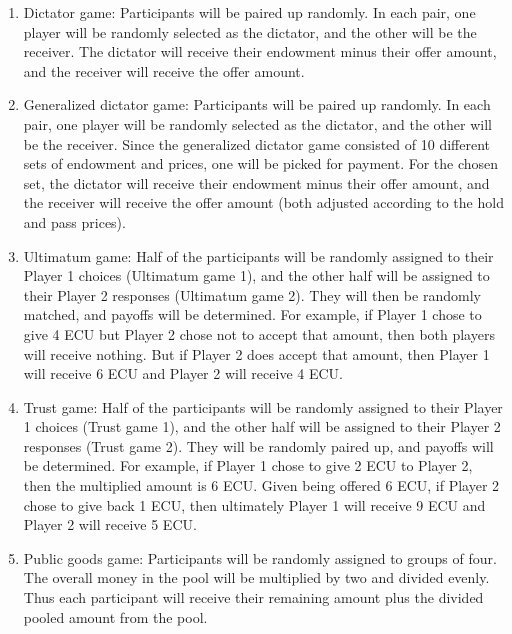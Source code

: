 \documentclass{article}
\begin{document}
\begin{enumerate}

\item Dictator game: Participants will be paired up randomly. In each pair, one player will be randomly selected as the dictator, and the other will be the receiver. The dictator will receive their endowment minus their offer amount, and the receiver will receive the offer amount.

\item Generalized dictator game: Participants will be paired up randomly. In each pair, one player will be randomly selected as the dictator, and the other will be the receiver.  Since the generalized dictator game consisted of 10 different sets of endowment and prices, one will be picked for payment. For the chosen set, the dictator will receive their endowment minus their offer amount, and the receiver will receive the offer amount (both adjusted according to the hold and pass prices).

\item Ultimatum game: Half of the participants will be randomly assigned to their Player 1 choices (Ultimatum game 1), and the other half will be assigned to their Player 2 responses (Ultimatum game 2). They will then be randomly matched, and payoffs will be determined. For example, if Player 1 chose to give 4 ECU but Player 2 chose not to accept that amount, then both players will receive nothing. But if Player 2 does accept that amount, then Player 1 will receive 6 ECU and Player 2 will receive 4 ECU.

\item Trust game: Half of the participants will be randomly assigned to their Player 1 choices (Trust game 1), and the other half will be assigned to their Player 2 responses (Trust game 2). They will be randomly paired up, and payoffs will be determined. For example, if Player 1 chose to give 2 ECU to Player 2, then the multiplied amount is 6 ECU. Given being offered 6 ECU, if Player 2 chose to give back 1 ECU, then ultimately Player 1 will receive 9 ECU and Player 2 will receive 5 ECU.

\item Public goods game: Participants will be randomly assigned to groups of four. The overall money in the pool will be multiplied by two and divided evenly. Thus each participant will receive their remaining amount plus the divided pooled amount from the pool.

\end{enumerate}
\end{document}
